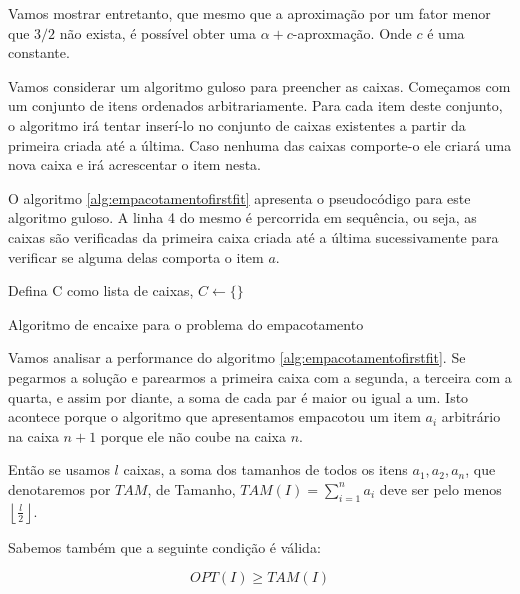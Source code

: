 Vamos mostrar entretanto, que mesmo que a aproximação por um fator menor que $3/2$ não exista, é possível obter uma $\alpha + c$-aproxmação. Onde $c$ é uma constante.

Vamos considerar um algoritmo guloso para preencher as caixas. Começamos com um conjunto de itens ordenados arbitrariamente. Para cada item deste conjunto, o algoritmo irá tentar inserí-lo no conjunto de caixas existentes a partir da primeira criada até a última. Caso nenhuma das caixas comporte-o ele criará uma nova caixa e irá acrescentar o item nesta.

O algoritmo \ref{alg:empacotamentofirstfit} apresenta o pseudocódigo para este algoritmo guloso. A linha 4 do mesmo é percorrida em sequência, ou seja, as caixas são verificadas da primeira caixa criada até a última sucessivamente para verificar se alguma delas comporta o item $a$.

\begin{algorithm}[H]
\SetAlgoLined
{}

Defina C como lista de caixas, $C \leftarrow \{\}$

\caption{Algoritmo de encaixe para o problema do empacotamento }
\label{alg:empacotamentofirstfit}
\end{algorithm}

Vamos analisar a performance do algoritmo \ref{alg:empacotamentofirstfit}. Se pegarmos a solução e parearmos a primeira caixa com a segunda, a terceira com a quarta, e assim por diante, a soma de cada par é maior ou igual a um. Isto acontece porque o algoritmo que apresentamos empacotou um item $a_i$ arbitrário na caixa $n+1$ porque ele não coube na caixa $n$.

Então se usamos $l$ caixas, a soma dos tamanhos de todos os itens $a_1, a_2, a_n$, que denotaremos por $TAM$, de Tamanho, $TAM(I) = \sum_{i=1}^{n} a_i$ deve ser pelo menos $\left \lfloor \frac{l}{2} \right \rfloor$.

Sabemos também que a seguinte condição é válida:

\begin{equation}
OPT(I) \geq TAM(I)
\end{equation}


